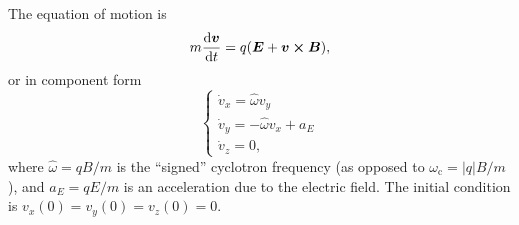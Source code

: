 \documentclass[11pt,a4paper, 
english, swedish %
]{article}
\newcommand{\wc}{\ensuremath{\omega_{\text{c}}}}
\begin{document}
The equation of motion is
\begin{equation}
m\dv{\vb*v}{t} = q\qty(\vb*E + \vb*v\cross\vb*B),
\end{equation}
or in component form
\begin{equation}\label{eq2:ODEs}
\begin{cases}
\dot{v}_x = \hat\omega v_y\\
\dot{v}_y = -\hat\omega v_x + a_E\\
\dot{v}_z = 0,
\end{cases}
\end{equation}
where $\hat\omega = qB/m$ is the ``signed'' cyclotron frequency 
(as opposed to $\wc=|q|B/m$), and $a_E=qE/m$ is an
acceleration due to the electric field. The initial condition is 
$v_x(0)=v_y(0)=v_z(0)=0$.
\end{document}
